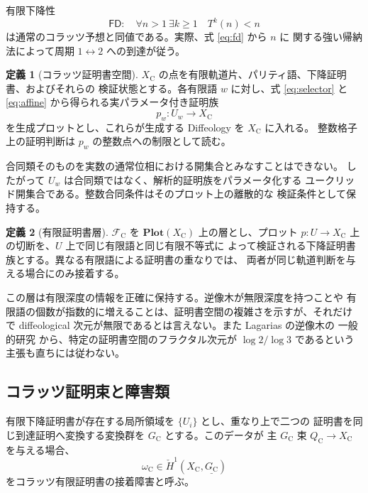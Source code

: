 \documentclass[a4paper,11pt]{ltjsarticle}
\theoremstyle{definition}
\newtheorem{definition}{定義}[section]
\theoremstyle{plain}
\newcommand{\Plot}{\mathbf{Plot}}
\newcommand{\FD}{\mathsf{FD}}
\newcommand{\1}{\mathbf{1}}
\begin{document}
有限下降性
\begin{equation}\label{eq:fd}
 \FD:\quad \forall n>1\ \exists k\ge1\quad T^k(n)<n
\end{equation}
は通常のコラッツ予想と同値である。実際、式 \eqref{eq:fd} から $n$ に
関する強い帰納法によって周期 $1\leftrightarrow2$ への到達が従う。

\begin{definition}[コラッツ証明書空間]
$X_{\mathrm C}$ の点を有限軌道片、パリティ語、下降証明書、およびそれらの
検証状態とする。各有限語 $w$ に対し、式 \eqref{eq:selector} と
\eqref{eq:affine} から得られる実パラメータ付き証明族
\[
 p_w:U_w\longrightarrow X_{\mathrm C}
\]
を生成プロットとし、これらが生成する Diffeology を $X_{\mathrm C}$ に入れる。
整数格子上の証明判断は $p_w$ の整数点への制限として読む。
\end{definition}

合同類そのものを実数の通常位相における開集合とみなすことはできない。
したがって $U_w$ は合同類ではなく、解析的証明族をパラメータ化する
ユークリッド開集合である。整数合同条件はそのプロット上の離散的な
検証条件として保持する。

\begin{definition}[有限証明書層]
$\mathcal F_{\mathrm C}$ を $\Plot(X_{\mathrm C})$ 上の層とし、プロット
$p:U\to X_{\mathrm C}$ 上の切断を、$U$ 上で同じ有限語と同じ有限不等式に
よって検証される下降証明書族とする。異なる有限語による証明書の重なりでは、
両者が同じ軌道判断を与える場合にのみ接着する。
\end{definition}

この層は有限深度の情報を正確に保持する。逆像木が無限深度を持つことや
有限語の個数が指数的に増えることは、証明書空間の複雑さを示すが、それだけ
で diffeological 次元が無限であるとは言えない。また Lagarias の逆像木の
一般的研究 \cite{Lagarias1985} から、特定の証明書空間のフラクタル次元が
$\log2/\log3$ であるという主張も直ちには従わない。

\subsection{コラッツ証明束と障害類}

有限下降証明書が存在する局所領域を $\{U_i\}$ とし、重なり上で二つの
証明書を同じ到達証明へ変換する変換群を $G_{\mathrm C}$ とする。このデータが
主 $G_{\mathrm C}$ 束 $Q_{\mathrm C}\to X_{\mathrm C}$ を与える場合、
\begin{equation}\label{eq:collatz-obstruction}
 \omega_{\mathrm C}
 \in\check H^1(X_{\mathrm C},\underline{G_{\mathrm C}})
\end{equation}
をコラッツ有限証明書の接着障害と呼ぶ。
\end{document}
